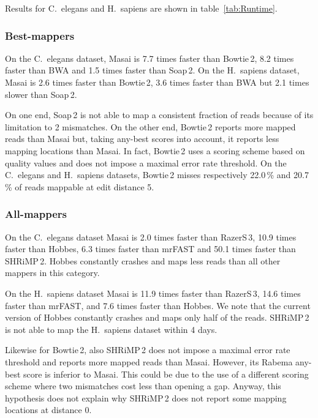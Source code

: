 Results for C.~elegans and H.~sapiens are shown in table~\ref{tab:Runtime}.

\subsubsection{Best-mappers}
On the C.~elegans dataset, Masai is 7.7 times faster than Bowtie\,2, 8.2 times faster than BWA and 1.5 times faster than Soap\,2.
On the H.~sapiens dataset, Masai is 2.6 times faster than Bowtie\,2, 3.6 times faster than BWA but 2.1 times slower than Soap\,2.

On one end, Soap\,2 is not able to map a consistent fraction of reads because of its limitation to 2 mismatches.
On the other end, Bowtie\,2 reports more mapped reads than Masai but, taking any-best scores into account, it reports less mapping locations than Masai.
In fact, Bowtie\,2 uses a scoring scheme based on quality values and does not impose a maximal error rate threshold.
On the C.~elegans and H.~sapiens datasets, Bowtie\,2 misses respectively 22.0\,\% and 20.7\,\% of reads mappable at edit distance 5.

\subsubsection{All-mappers}
On the C.~elegans dataset Masai is 2.0 times faster than RazerS\,3, 10.9 times faster than Hobbes, 6.3 times faster than mrFAST and 50.1 times faster than SHRiMP\,2.
Hobbes constantly crashes and maps less reads than all other mappers in this category.

On the H.~sapiens dataset Masai is 11.9 times faster than RazerS\,3, 14.6 times faster than mrFAST, and 7.6 times faster than Hobbes.
We note that the current version of Hobbes constantly crashes and maps only half of the reads.
SHRiMP\,2 is not able to map the H.~sapiens dataset within 4 days.

Likewise for Bowtie\,2, also SHRiMP\,2 does not impose a maximal error rate threshold and reports more mapped reads than Masai.
However, its Rabema any-best score is inferior to Masai.
This could be due to the use of a different scoring scheme where two mismatches cost less than opening a gap.
Anyway, this hypothesis does not explain why SHRiMP\,2 does not report some mapping locations at distance 0.

